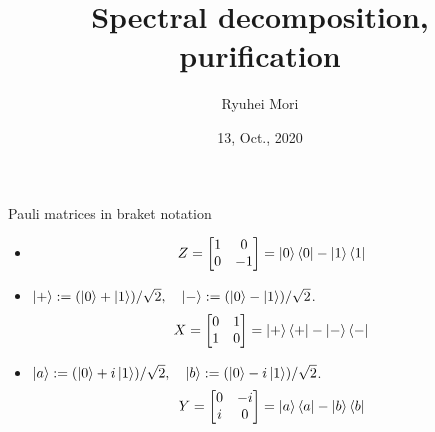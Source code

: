 \documentclass[10pt]{beamer}
\title{Spectral decomposition, purification}
\author{Ryuhei Mori}
\institute{Tokyo Institute of Technology}
\date{13, Oct., 2020}
\begin{document}
\begin{frame}[plain]
\maketitle
\end{frame}

\begin{frame}{Pauli matrices in braket notation}
\begin{itemize}
\setlength{\itemsep}{3em}
\item
\begin{equation*}
Z=\begin{bmatrix}1&0\\0&-1\end{bmatrix}=
\ket{0}\bra{0}
-\ket{1}\bra{1}
\end{equation*}
\item
$\ket{+}:=(\ket{0}+\ket{1})/\sqrt{2},\quad  \ket{-}:=(\ket{0}-\ket{1})/\sqrt{2}$.
\begin{equation*}
X=\begin{bmatrix}0&1\\1&0\end{bmatrix}=
\ket{+}\bra{+}
-\ket{-}\bra{-}
\end{equation*}
\item
$\ket{a}:=(\ket{0}+i\ket{1})/\sqrt{2},\quad  \ket{b}:=(\ket{0}-i\ket{1})/\sqrt{2}$.
\begin{equation*}
Y=\begin{bmatrix}0&-i\\i&0\end{bmatrix}=
\ket{a}\bra{a}
-\ket{b}\bra{b}
\end{equation*}
\end{itemize}
\end{frame}
\end{document}

